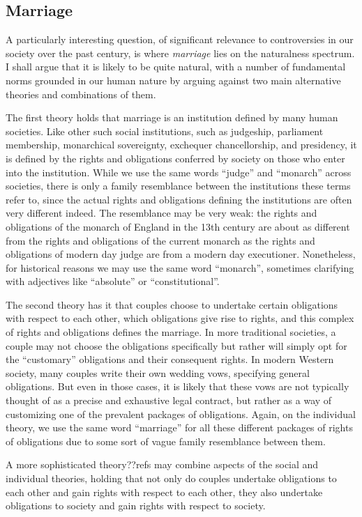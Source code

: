 \subsection{Marriage}
A particularly interesting question, of significant relevance to controversies in our society over the past century, is where \textit{marriage}
lies on the naturalness spectrum. I shall argue that it is likely to be quite natural, with a number of fundamental norms grounded in our human
nature by arguing against two main alternative theories and combinations of them.

The first theory holds that marriage is an institution defined by many human societies. Like other such social institutions, such as judgeship, parliament membership,
monarchical sovereignty, exchequer chancellorship, and presidency, it is defined by the rights and obligations conferred by society on those who enter into the institution.
While we use the same words ``judge'' and ``monarch'' across societies, there is only a family resemblance between the institutions these terms refer to, since the actual
rights and obligations defining the institutions are often very different indeed. The resemblance may be very weak: the rights and obligations of the monarch of England
in the 13th century are about as different from the rights and obligations of the current monarch as the rights and obligations of modern day judge are from a modern day
executioner. Nonetheless, for historical reasons we may use the same word ``monarch'', sometimes clarifying with adjectives like ``absolute'' or ``constitutional''.

The second theory has it that couples choose to undertake certain obligations with respect to each other, which obligations give rise to rights,
and this complex of rights and obligations defines the marriage. In more traditional societies, a couple may not choose the obligations specifically
but rather will simply opt for the ``customary'' obligations and their consequent rights. In modern Western society, many couples write their own
wedding vows, specifying general obligations. But even in those cases, it is likely that these vows are not typically thought of as a precise and exhaustive
legal contract, but rather as a way of customizing one of the prevalent packages of obligations. Again, on the individual theory, we use the same word
``marriage'' for all these different packages of rights of obligations due to some sort of vague family resemblance between them.

A more sophisticated theory??refs may combine aspects of the social and individual theories, holding that not only do couples undertake obligations to each other and gain
rights with respect to each other, they also undertake obligations to society and gain rights with respect to society.

